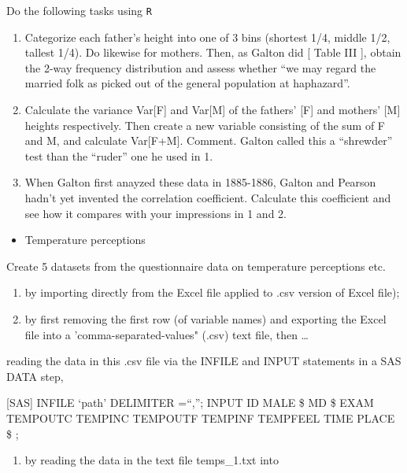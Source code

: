 \documentclass[]{book}
\providecommand{\tightlist}{%
  \setlength{\itemsep}{0pt}\setlength{\parskip}{0pt}}
\begin{document}
Do the following tasks using \texttt{R}

\begin{enumerate}
\def\labelenumi{\arabic{enumi}.}
\item
  Categorize each father's height into one of 3 bins (shortest 1/4, middle 1/2, tallest 1/4). Do likewise for mothers. Then, as Galton did {[} Table III {]}, obtain the 2-way frequency distribution and assess whether ``we may regard the married folk as picked out of the general population at haphazard''.
\item
  Calculate the variance Var{[}F{]} and Var{[}M{]} of the fathers' {[}F{]} and mothers' {[}M{]} heights respectively. Then create a new variable consisting of the sum of F and M, and calculate Var{[}F+M{]}. Comment. Galton called this a ``shrewder'' test than the ``ruder'' one he used in 1.
\item
  When Galton first anayzed these data in 1885-1886, Galton and Pearson hadn't yet invented the correlation coefficient. Calculate this coefficient and see how it compares with your impressions in 1 and 2.
\end{enumerate}

\begin{itemize}
\tightlist
\item
  Temperature perceptions
\end{itemize}

Create 5 datasets from the questionnaire data on temperature perceptions etc.

\begin{enumerate}
\def\labelenumi{(\roman{enumi})}
\item
  by importing directly from the Excel file applied to .csv version of Excel file);
\item
  by first removing the first row (of variable names) and exporting the Excel file into a 'comma-separated-values" (.csv) text file, then \ldots{}
\end{enumerate}

reading the data in this .csv file via the INFILE and INPUT statements in a SAS DATA step,

{[}SAS{]}
INFILE `path' DELIMITER =``,'';
INPUT ID MALE \$ MD \$ EXAM TEMPOUTC TEMPINC TEMPOUTF TEMPINF TEMPFEEL TIME PLACE \$ ;

\begin{enumerate}
\def\labelenumi{(\roman{enumi})}
\setcounter{enumi}{2}
\tightlist
\item
  by reading the data in the text file temps\_1.txt into
\end{enumerate}
\end{document}
